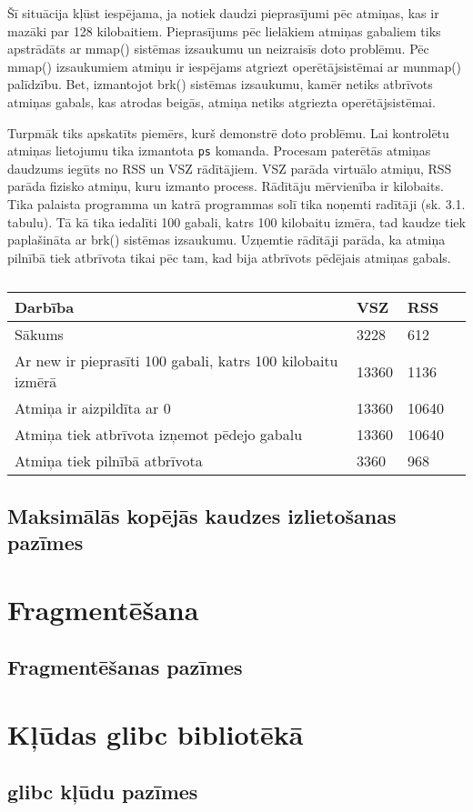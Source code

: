 Šī situācija kļūst iespējama, ja notiek daudzi pieprasījumi pēc atmiņas, kas ir mazāki par 128 kilobaitiem.
Pieprasījums pēc lielākiem atmiņas gabaliem tiks apstrādāts ar mmap() sistēmas izsaukumu un neizraisīs doto problēmu.
Pēc mmap() izsaukumiem atmiņu ir iespējams atgriezt operētājsistēmai ar munmap() palīdzību. 
Bet, izmantojot brk() sistēmas izsaukumu, kamēr netiks atbrīvots atmiņas gabals, kas atrodas beigās, atmiņa netiks atgriezta operētājsistēmai.

Turpmāk tiks apskatīts piemērs, kurš demonstrē doto problēmu.
Lai kontrolētu atmiņas lietojumu tika izmantota \texttt{ps} komanda.
Procesam paterētās atmiņas daudzums iegūts no RSS un VSZ rādītājiem.
VSZ parāda virtuālo atmiņu, RSS parāda fizisko atmiņu, kuru izmanto process.
Rādītāju mērvienība ir kilobaits.
Tika palaista programma un katrā programmas solī tika noņemti radītāji (sk. 3.1. tabulu).
Tā kā tika iedalīti 100 gabali, katrs 100 kilobaitu izmēra, tad kaudze tiek paplašināta ar brk() sistēmas izsaukumu.
Uzņemtie rādītāji parāda, ka atmiņa pilnībā tiek atbrīvota tikai pēc tam, kad bija atbrīvots pēdējais atmiņas gabals.

\begin{table}[H]
\caption{\textbf{\fontsize{11}{12}\selectfont {Programmas RSS un VSZ radītāji}}} 
\label{table:kysymys}
\centering
	\begin{tabular}{|l|l|l|p{5cm}|}
	  \hline
	Darbība & VSZ & RSS \\
    \hline
    Sākums & 3228 & 612 \\
	\hline
	  Ar new ir pieprasīti 100 gabali, katrs 100 kilobaitu izmērā  & 13360  & 1136 \\
      \hline
      Atmiņa ir aizpildīta ar 0 &  13360 & 10640\\
      \hline
      Atmiņa tiek atbrīvota izņemot pēdejo gabalu & 13360 & 10640 \\
      \hline
      Atmiņa tiek pilnībā atbrīvota & 3360 & 968 \\
    \hline
	\end{tabular}
\end{table}

\subsection{Maksimālās kopējās kaudzes izlietošanas pazīmes}



\section{Fragmentēšana}
\subsection{Fragmentēšanas pazīmes}

\section{Kļūdas glibc bibliotēkā}
\subsection{glibc kļūdu pazīmes}

